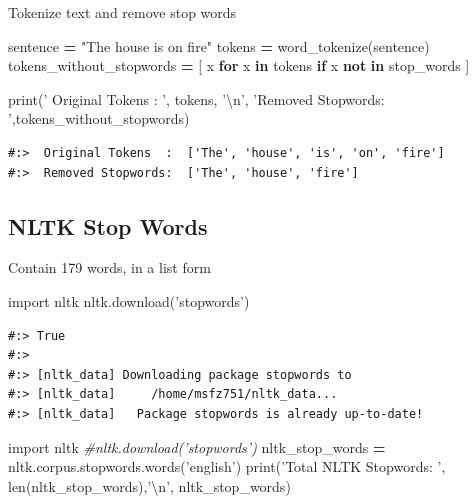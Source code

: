 \documentclass[
]{book}
\newenvironment{Shaded}{\begin{snugshade}}{\end{snugshade}}
\newcommand{\BuiltInTok}[1]{#1}
\newcommand{\CharTok}[1]{\textcolor[rgb]{0.5,0.5,0.5}{#1}}
\newcommand{\CommentTok}[1]{\textcolor[rgb]{0.37,0.37,0.37}{\textit{#1}}}
\newcommand{\ControlFlowTok}[1]{\textcolor[rgb]{0.27,0.27,0.27}{\textbf{#1}}}
\newcommand{\ImportTok}[1]{#1}
\newcommand{\KeywordTok}[1]{\textcolor[rgb]{0.27,0.27,0.27}{\textbf{#1}}}
\newcommand{\NormalTok}[1]{#1}
\newcommand{\OperatorTok}[1]{\textcolor[rgb]{0.43,0.43,0.43}{\textbf{#1}}}
\newcommand{\StringTok}[1]{\textcolor[rgb]{0.5,0.5,0.5}{#1}}
\begin{document}
Tokenize text and remove stop words

\begin{Shaded}
\begin{Highlighting}[]
\NormalTok{sentence }\OperatorTok{=} \StringTok{"The house is on fire"}
\NormalTok{tokens   }\OperatorTok{=}\NormalTok{ word_tokenize(sentence)}
\NormalTok{tokens_without_stopwords }\OperatorTok{=}\NormalTok{ [ x }\ControlFlowTok{for}\NormalTok{ x }\KeywordTok{in}\NormalTok{ tokens }\ControlFlowTok{if}\NormalTok{ x }\KeywordTok{not} \KeywordTok{in}\NormalTok{ stop_words ]}

\BuiltInTok{print}\NormalTok{(}\StringTok{' Original Tokens  : '}\NormalTok{, tokens, }\StringTok{'}\CharTok{\textbackslash{}n}\StringTok{'}\NormalTok{,}
      \StringTok{'Removed Stopwords: '}\NormalTok{,tokens_without_stopwords)}
\end{Highlighting}
\end{Shaded}

\begin{verbatim}
#:>  Original Tokens  :  ['The', 'house', 'is', 'on', 'fire'] 
#:>  Removed Stopwords:  ['The', 'house', 'fire']
\end{verbatim}

\hypertarget{nltk-stop-words}{%
\subsection{NLTK Stop Words}\label{nltk-stop-words}}

Contain 179 words, in a list form

\begin{Shaded}
\begin{Highlighting}[]
\ImportTok{import}\NormalTok{ nltk}
\NormalTok{nltk.download(}\StringTok{'stopwords'}\NormalTok{)}
\end{Highlighting}
\end{Shaded}

\begin{verbatim}
#:> True
#:> 
#:> [nltk_data] Downloading package stopwords to
#:> [nltk_data]     /home/msfz751/nltk_data...
#:> [nltk_data]   Package stopwords is already up-to-date!
\end{verbatim}

\begin{Shaded}
\begin{Highlighting}[]
\ImportTok{import}\NormalTok{ nltk}
\CommentTok{#nltk.download('stopwords')}
\NormalTok{nltk_stop_words }\OperatorTok{=}\NormalTok{ nltk.corpus.stopwords.words(}\StringTok{'english'}\NormalTok{)}
\BuiltInTok{print}\NormalTok{(}\StringTok{'Total NLTK Stopwords: '}\NormalTok{, }\BuiltInTok{len}\NormalTok{(nltk_stop_words),}\StringTok{'}\CharTok{\textbackslash{}n}\StringTok{'}\NormalTok{,}
\NormalTok{      nltk_stop_words)}
\end{Highlighting}
\end{Shaded}
\end{document}
